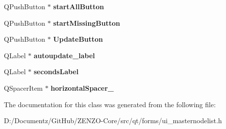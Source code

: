 \begin{DoxyCompactItemize}
\mbox{\label{class_ui___masternode_list_ae7894090e5b9d4cb9f97c777a1bdc8ad}} 
Q\+Push\+Button $\ast$ {\bfseries start\+All\+Button}
\item 
\mbox{\label{class_ui___masternode_list_afa19fb61ca502f33e75857c5356eb37c}} 
Q\+Push\+Button $\ast$ {\bfseries start\+Missing\+Button}
\item 
\mbox{\label{class_ui___masternode_list_ac7d00ef09353cab378dd5d2f3855f0ba}} 
Q\+Push\+Button $\ast$ {\bfseries Update\+Button}
\item 
\mbox{\label{class_ui___masternode_list_a3732dc58413b4a6d339c631e967d0e52}} 
Q\+Label $\ast$ {\bfseries autoupdate\+\_\+label}
\item 
\mbox{\label{class_ui___masternode_list_ae436a399c9a85038fdf477dfee417960}} 
Q\+Label $\ast$ {\bfseries seconds\+Label}
\item 
\mbox{\label{class_ui___masternode_list_a4b265c1ad5a448b8ce0269a130d6e205}} 
Q\+Spacer\+Item $\ast$ {\bfseries horizontal\+Spacer\+\_}
\end{DoxyCompactItemize}


The documentation for this class was generated from the following file\+:\begin{DoxyCompactItemize}
\item 
D\+:/\+Documentz/\+Git\+Hub/\+Z\+E\+N\+Z\+O-\/\+Core/src/qt/forms/ui\+\_\+masternodelist.\+h\end{DoxyCompactItemize}
